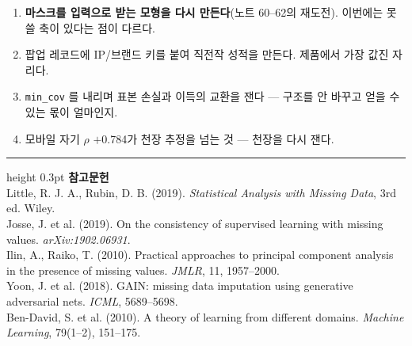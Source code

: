 \documentclass[10pt]{article}
\begin{document}
\begin{enumerate}[leftmargin=1.3em,itemsep=0.15em]
\item \textbf{마스크를 입력으로 받는 모형을 다시 만든다}(노트 60--62의 재도전).
      이번에는 못 쓸 축이 있다는 점이 다르다.
\item 팝업 레코드에 IP/브랜드 키를 붙여 직전작 성적을 만든다. 제품에서 가장
      값진 자리다.
\item \texttt{min\_cov} 를 내리며 표본 손실과 이득의 교환을 잰다 --- 구조를
      안 바꾸고 얻을 수 있는 몫이 얼마인지.
\item 모바일 자기 $\rho$ $+$0.784가 천장 추정을 넘는 것 --- 천장을 다시 잰다.
\end{enumerate}

\vspace{0.6em}
\hrule height 0.3pt
\vspace{0.5em}
{\footnotesize
\textbf{참고문헌}\\[0.3em]
Little, R. J. A., Rubin, D. B. (2019). \emph{Statistical Analysis with Missing
Data}, 3rd ed. Wiley.\\[0.15em]
Josse, J. et al. (2019). On the consistency of supervised learning with missing
values. \emph{arXiv:1902.06931}.\\[0.15em]
Ilin, A., Raiko, T. (2010). Practical approaches to principal component analysis
in the presence of missing values. \emph{JMLR}, 11, 1957--2000.\\[0.15em]
Yoon, J. et al. (2018). GAIN: missing data imputation using generative
adversarial nets. \emph{ICML}, 5689--5698.\\[0.15em]
Ben-David, S. et al. (2010). A theory of learning from different domains.
\emph{Machine Learning}, 79(1--2), 151--175.
}
\end{document}
